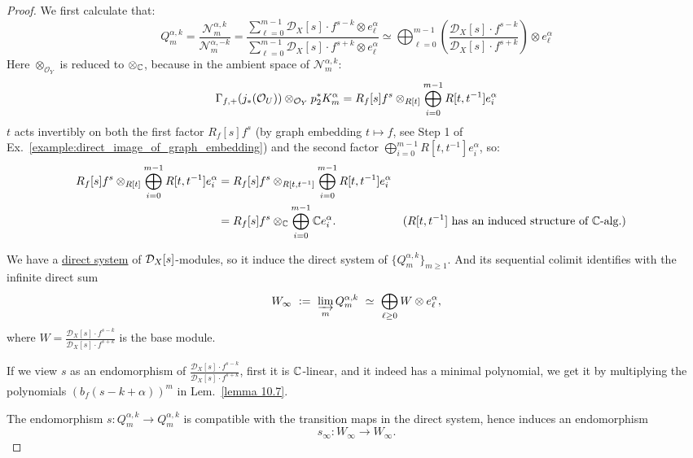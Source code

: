 \begin{proof}
    We first calculate that:
    \[
        Q_m^{\alpha,k} = \frac{\mathcal{N}_m^{\alpha,k}}{\mathcal{N}_m^{\alpha,-k}}
        = \frac{\sum_{\ell=0}^{m-1} \mathcal{D}_X[s] \cdot f^{s-k} \otimes e_\ell^\alpha}{\sum_{\ell=0}^{m-1} \mathcal{D}_X[s] \cdot f^{s+k} \otimes e_\ell^\alpha}
        \simeq \bigoplus_{\ell=0}^{m-1} \left( \frac{\mathcal{D}_X[s] \cdot f^{s-k}}{\mathcal{D}_X[s] \cdot f^{s+k}} \right) \otimes e_\ell^\alpha
    \]
    Here $\otimes_{\mathcal{O}_Y}$ is reduced to $\otimes_{\mathbb{C}}$, because in the ambient space of $\mathcal{N}^{\alpha,k}_m$:
    \[
        \Gamma_{f,+}(j_*(\mathcal{O}_U)) \otimes_{\mathcal{O}_Y} p_2^* K_m^{\alpha} = R_f[s]f^s \otimes_{R[t]} \bigoplus_{i=0}^{m-1} R[t, t^{-1}] e^\alpha_i
    \]
    $t$ acts invertibly on both the first factor $R_f[s]f^s$ (by graph embedding $t\mapsto f$, see Step 1 of Ex.~\ref{example:direct_image_of_graph_embedding})
    and the second factor $\bigoplus_{i=0}^{m-1} R[t, t^{-1}] e^\alpha_i$, so:
    \begin{align*}
        R_f[s]f^s \otimes_{R[t]} \bigoplus_{i=0}^{m-1} R[t, t^{-1}] e^\alpha_i & = R_f[s]f^s \otimes_{R[t, t^{-1}]} \bigoplus_{i=0}^{m-1} R[t, t^{-1}] e^\alpha_i                                                                   \\
                                                                               & = R_f[s]f^s \otimes_{\mathbb{C}} \bigoplus_{i=0}^{m-1} \mathbb{C} e^\alpha_i.                    &  & \text{($R[t,t^{-1}]$ has an induced structure of $\mathbb{C}$-alg.)}
    \end{align*}


    We have a \hyperref[construction_of_direct_system_of_N_m_alpha_k]{direct system} of $\mathcal{D}_X[s]$-modules, so it induce the direct system of $\{Q_m^{\alpha,k}\}_{m\ge 1}$.
    And its sequential colimit identifies with the infinite direct sum
    \[
        W_\infty\ :=\ \varinjlim_m Q_m^{\alpha,k}\ \simeq\ \bigoplus_{\ell\ge 0} W\otimes e_\ell^\alpha,
    \]
    where $W = \frac{\mathcal{D}_X[s] \cdot f^{s-k}}{\mathcal{D}_X[s] \cdot f^{s+k}}$ is the base module.

    If we view $s$ as an endomorphism of $\frac{\mathcal{D}_X[s] \cdot f^{s-k}}{\mathcal{D}_X[s] \cdot f^{s+k}}$,
    first it is $\mathbb{C}$-linear, and it indeed has a minimal polynomial, we get it by multiplying the polynomials $(b_f(s-k+\alpha))^m$ in Lem.~\ref{lemma 10.7}.

    The endomorphism $s:Q_m^{\alpha,k}\to Q_m^{\alpha,k}$ is compatible with the transition maps in the direct system,
    hence induces an endomorphism
    \[
        s_\infty:W_\infty\longrightarrow W_\infty.
    \]


\end{proof}
